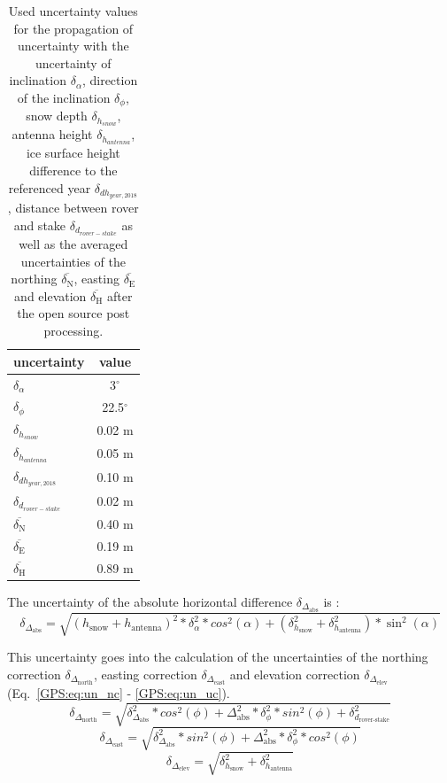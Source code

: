 \begin{table}[h]
	\caption{Used uncertainty values for the propagation of uncertainty with the uncertainty of inclination $ \delta_{\alpha} $, direction of the inclination $ \delta_{\phi} $, snow depth $ \delta_{h_{snow}}$, antenna height $ \delta_{h_{antenna}} $, ice surface height difference to the referenced year $ \delta_{dh_{year,2018}}$, distance between rover and stake $ \delta_{d_{rover-stake}} $ as well as the averaged uncertainties of the northing $ \overline{\delta_{\text{N}}} $, easting $ \overline{\delta_{\text{E}}} $ and elevation $ \overline{\delta_{\text{H}}} $ after the open source post processing.}
	\centering
	\begin{tabular}{lc}
	\toprule
        uncertainty &  value \\
	\midrule
    $ \delta_{\alpha} $ &  3$^{\circ}$ \\
    $ \delta_{\phi} $ &  22.5$^{\circ}$ \\
    $ \delta_{h_{snow}}$ &  0.02 m \\
    $ \delta_{h_{antenna}} $ &  0.05 m \\
    $ \delta_{dh_{year,2018}} $ &  0.10 m \\
    $ \delta_{d_{rover-stake}} $ &  0.02 m \\
    $ \overline{\delta_{\text{N}}} $ & 0.40 m \\
    $ \overline{\delta_{\text{E}}} $ & 0.19 m \\
    $ \overline{\delta_{\text{H}}} $ & 0.89 m \\
    \bottomrule
	\end{tabular}
	\label{GPS:tab:errors}
\end{table} 

The uncertainty of the absolute horizontal difference $\delta_{\Delta_{\text{abs}}}$ is :
\begin{equation}
	\delta_{\Delta_{\text{abs}}} = \sqrt{(h_{\text{snow}} + h_{\text{antenna}})^2 * \delta_{\alpha}^2 * cos^2(\alpha) + (\delta_{h_{\text{snow}}}^2 + \delta_{h_{\text{antenna}}}^2) * \sin^2(\alpha)}
\end{equation}

This uncertainty goes into the calculation of the uncertainties of the northing correction $\delta_{\Delta_{\text{north}}}$, easting correction $\delta_{\Delta_{\text{east}}}$ and elevation correction $\delta_{\Delta_{\text{elev}}}$ (Eq.~\ref{GPS:eq:un_nc} - \ref{GPS:eq:un_uc}). 
\begin{equation} \label{GPS:eq:un_nc}
	\delta_{\Delta_{\text{north}}} = \sqrt{\delta_{\Delta_{\text{abs}}}^2 * cos^2(\phi) + \Delta_{\text{abs}}^2 * \delta_{\phi}^2 * sin^2(\phi) + \delta_{d_{\text{rover-stake}}}^2}
\end{equation}
\begin{equation} \label{GPS:eq:un_ec}
	\delta_{\Delta_{\text{east}}} = \sqrt{\delta_{\Delta_{\text{abs}}}^2 * sin^2(\phi) + \Delta_{\text{abs}}^2 * \delta_{\phi}^2 * cos^2(\phi)}
\end{equation}
\begin{equation} \label{GPS:eq:un_uc}
\delta_{\Delta_{\text{elev}}} = \sqrt{\delta_{h_{\text{snow}}}^2 + \delta_{h_{\text{antenna}}}^2}
\end{equation}
	
